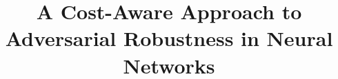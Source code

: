\documentclass[conference]{IEEEtran}
\begin{document}
\title{A Cost-Aware Approach to Adversarial Robustness in Neural Networks}

\maketitle


\author{}

\end{document}
